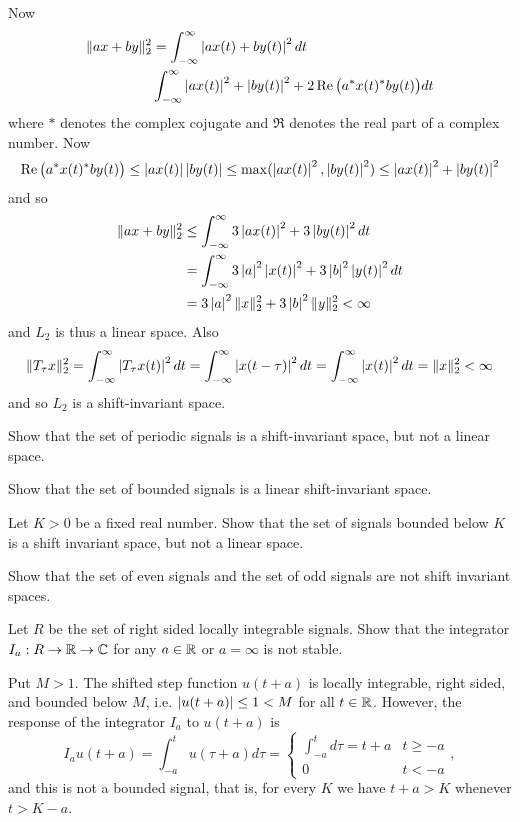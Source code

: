 \begin{excersizelist}
\begin{solution}
Now
\begin{align*}
\|a x + b y\|_2^2 &= \int_{-\infty}^\infty \left\vert ax(t) + by(t) \right\vert^2 dt \\
& \int_{-\infty}^\infty \left\vert a x(t) \right\vert^2 + \left\vert  b y(t) \right\vert^2 + 2 \operatorname{Re}\big( a^* x(t)^* b y(t) \big) dt
\end{align*}
where $*$ denotes the complex cojugate and $\Re$ denotes the real part of a complex number.  Now
\[
\operatorname{Re}\big( a^* x(t)^* b y(t) \big) \leq \left\vert a x(t) \right\vert \left\vert b y(t) \right\vert \leq \max(\left\vert a x(t) \right\vert^2, \left\vert b y(t) \right\vert^2) \leq \left\vert a x(t) \right\vert^2 + \left\vert b y(t) \right\vert^2
\]
and so
\begin{align*}
\|a x + b y\|_2^2 &\leq \int_{-\infty}^\infty 3\left\vert a x(t) \right\vert^2 + 3\left\vert  b y(t) \right\vert^2 dt \\
&= \int_{-\infty}^\infty 3\left\vert a \right\vert^2\left\vert x(t) \right\vert^2 + 3\left\vert b \right\vert^2\left\vert  y(t) \right\vert^2 dt \\
&= 3 \left\vert a \right\vert^2 \|x\|_2^2 + 3 \left\vert b \right\vert^2 \|y\|_2^2 < \infty
\end{align*}
and $L_2$ is thus a linear space.  Also
\[
\|T_\tau x\|_2^2 = \int_{-\infty}^\infty \left\vert  T_\tau x(t)  \right\vert^2 dt = \int_{-\infty}^\infty \left\vert x(t - \tau) \right\vert^2 dt = \int_{-\infty}^\infty \left\vert x(t) \right\vert^2 dt = \|x\|_2^2 < \infty
\]
and so $L_2$ is a shift-invariant space.
\end{solution}

\item \label{exer:periodicshiftinvariantnotlinear} Show that the set of periodic signals is a shift-invariant space, but not a linear space.

\item \label{exer:boundedlinearshiftinvar} Show that the set of bounded signals is a linear shift-invariant space.

\item \label{exer:boundconstantnotlinear} Let $K > 0$ be a fixed real number. Show that the set of signals bounded below $K$ is a shift invariant space, but not a linear space. 

\item \label{exer:evenoddnoshiftinvariant} Show that the set of even signals and the set of odd signals are not shift invariant spaces.

\item \label{excer:integratornotstable} Let $R$ be the set of right sided locally integrable signals.  Show that the integrator $I_a : R \to {\mathbb R} \to {\mathbb C}$ for any $a\in{\mathbb R}$ or $a = \infty$ is not stable.
\begin{solution}
Put $M > 1$.  The shifted step function $u(t + a)$ is locally integrable, right sided, and bounded below $M$, i.e. $\vert u(t+a) \vert \leq 1 < M$ for all $t \in {\mathbb R}$.  However, the response of the integrator $I_a$ to $u(t+a)$ is
\[
I_au(t+a) = \int_{-a}^t u(\tau + a)d\tau = \begin{cases}
\int_{-a}^t d\tau = t + a & t \geq -a \\
0 & t < -a 
\end{cases},
\]
and this is not a bounded signal, that is, for every $K$ we have $t + a > K$ whenever $t > K - a$.
\end{solution}


\end{excersizelist}
